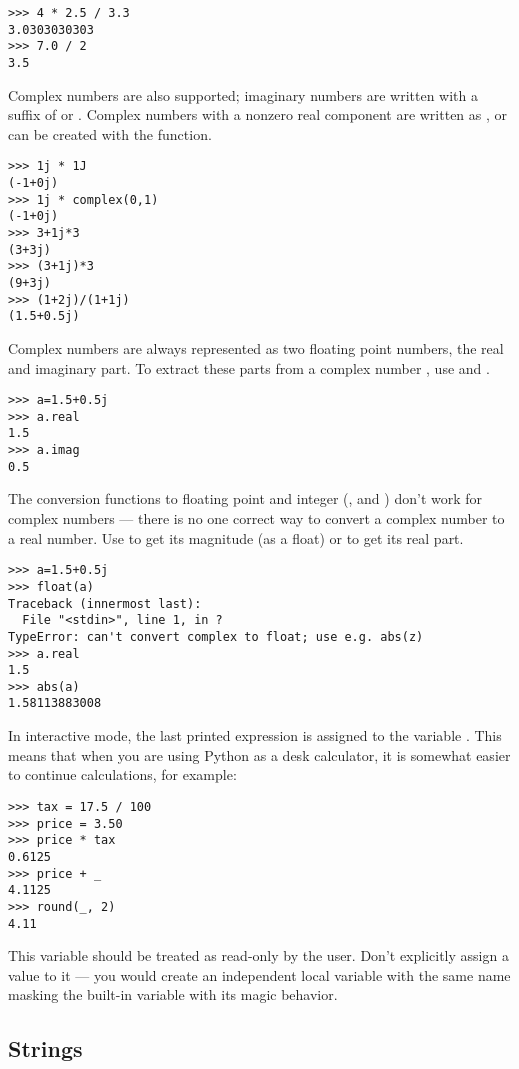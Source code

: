 \bcode\begin{verbatim}
>>> 4 * 2.5 / 3.3
3.0303030303
>>> 7.0 / 2
3.5
\end{verbatim}\ecode
%
Complex numbers are also supported; imaginary numbers are written with
a suffix of  or .  Complex numbers with a nonzero
real component are written as , or can
be created with the  function.

\bcode\begin{verbatim}
>>> 1j * 1J
(-1+0j)
>>> 1j * complex(0,1)
(-1+0j)
>>> 3+1j*3
(3+3j)
>>> (3+1j)*3
(9+3j)
>>> (1+2j)/(1+1j)
(1.5+0.5j)
\end{verbatim}\ecode
%
Complex numbers are always represented as two floating point numbers,
the real and imaginary part.  To extract these parts from a complex
number , use  and .  

\bcode\begin{verbatim}
>>> a=1.5+0.5j
>>> a.real
1.5
>>> a.imag
0.5
\end{verbatim}\ecode
%
The conversion functions to floating point and integer
(,  and ) don't work for
complex numbers --- there is no one correct way to convert a complex
number to a real number.  Use  to get its magnitude (as a
float) or  to get its real part.

\bcode\begin{verbatim}
>>> a=1.5+0.5j
>>> float(a)
Traceback (innermost last):
  File "<stdin>", line 1, in ?
TypeError: can't convert complex to float; use e.g. abs(z)
>>> a.real
1.5
>>> abs(a)
1.58113883008
\end{verbatim}\ecode
%
In interactive mode, the last printed expression is assigned to the
variable \code{_}.  This means that when you are using Python as a
desk calculator, it is somewhat easier to continue calculations, for
example:

\begin{verbatim}
>>> tax = 17.5 / 100
>>> price = 3.50
>>> price * tax
0.6125
>>> price + _
4.1125
>>> round(_, 2)
4.11
\end{verbatim}

This variable should be treated as read-only by the user.  Don't
explicitly assign a value to it --- you would create an independent
local variable with the same name masking the built-in variable with
its magic behavior.

\subsection{Strings}

